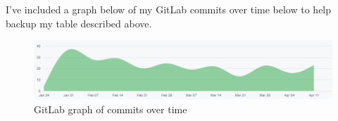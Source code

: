 I've included a graph below of my GitLab commits over time below to help backup my table described above. 

\begin{figure}[H]
	\centering
	\includegraphics[width=1\linewidth]{Figures/gitlab-commit-graph.png}
	\caption{GitLab graph of commits over time}
	\label{fig:gitlab-graph}
\end{figure}